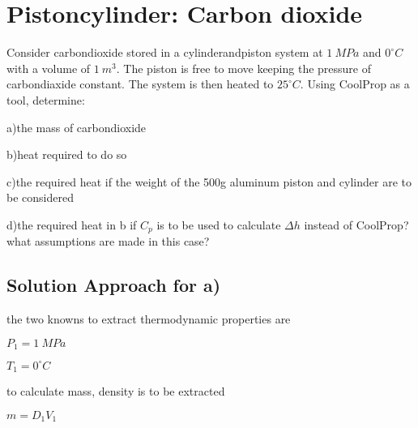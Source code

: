 \documentclass[letterpaper,10pt,english]{jupyterBook}
\begin{document}
\section{Piston\sphinxhyphen{}cylinder: Carbon dioxide}
\label{\detokenize{notebooks/Chapter5/CH5-Q2:piston-cylinder-carbon-dioxide}}\label{\detokenize{notebooks/Chapter5/CH5-Q2::doc}}
\sphinxAtStartPar
Consider carbon\sphinxhyphen{}dioxide stored in a cylinder\sphinxhyphen{}and\sphinxhyphen{}piston system at \(1\:MPa\) and \(0 ^{\circ}  C\) with a volume of \(1\:m^3\). The piston is free to move keeping the pressure of carbon\sphinxhyphen{}diaxide constant. The system is then heated to \(25 ^{\circ} C\). Using CoolProp as a tool, determine:

\sphinxAtStartPar
a)the mass of carbon\sphinxhyphen{}dioxide

\sphinxAtStartPar
b)heat required to do so

\sphinxAtStartPar
c)the required heat if the weight of the 500g aluminum piston and cylinder are to be considered

\sphinxAtStartPar
d)the required heat in b if \(C_p\) is to be used to calculate \(\Delta h\) instead of CoolProp? what assumptions are made in this case?


\subsection{Solution Approach for a)}
\label{\detokenize{notebooks/Chapter5/CH5-Q2:solution-approach-for-a}}
\sphinxAtStartPar
the two knowns to extract thermodynamic properties are

\sphinxAtStartPar
\(P_1=1\:MPa\)

\sphinxAtStartPar
\(T_1=0 ^{\circ}  C\)

\sphinxAtStartPar
to calculate mass, density is to be extracted

\sphinxAtStartPar
\(m=D_1V_1\)
\end{document}
